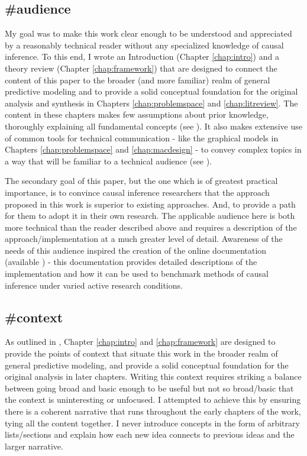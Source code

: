\documentclass[./main.tex]{subfiles}
\begin{document}

\subsection*{\textbf{\#audience}}
\label{hc:audience}

My goal was to make this work clear enough to be understood and appreciated by a reasonably technical reader without any specialized knowledge of causal inference. To this end, I wrote an Introduction (Chapter \ref{chap:intro}) and a theory review (Chapter \ref{chap:framework}) that are designed to connect the content of this paper to the broader (and more familiar) realm of general predictive modeling and to provide a solid conceptual foundation for the original analysis and synthesis in Chapters \ref{chap:problemspace} and \ref{chap:litreview}. The content in these chapters makes few assumptions about prior knowledge, thoroughly explaining all fundamental concepts (see ). It also makes extensive use of common tools for technical communication - like the graphical models in Chapters \ref{chap:problemspace} and \ref{chap:macdesign} - to convey complex topics in a way that will be familiar to a technical audience (see ).

\vspace{\baselineskip}

The secondary goal of this paper, but the one which is of greatest practical importance, is to convince causal inference researchers that the approach proposed in this work is superior to existing approaches. And, to provide a path for them to adopt it in their own research. The applicable audience here is both more technical than the reader described above and requires a description of the approach/implementation at a much greater level of detail. Awareness of the needs of this audience inspired the creation of the online documentation (available ) - this documentation provides detailed descriptions of the implementation and how it can be used to benchmark methods of causal inference under varied active research conditions.


\subsection*{\textbf{\#context}}
\label{hc:context}

As outlined in , Chapter \ref{chap:intro} and \ref{chap:framework} are designed to provide the points of context that situate this work in the broader realm of general predictive modeling, and provide a solid conceptual foundation for the original analysis in later chapters. Writing this context requires striking a balance between going broad and basic enough to be useful but not so broad/basic that the context is uninteresting or unfocused. I attempted to achieve this by ensuring there is a coherent narrative that runs throughout the early chapters of the work, tying all the content together. I never introduce concepts in the form of arbitrary lists/sections and explain how each new idea connects to previous ideas and the larger narrative.
\end{document}
